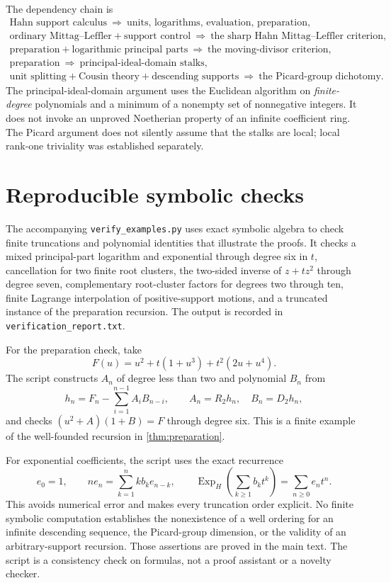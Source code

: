 \documentclass[11pt,letterpaper]{article}
\theoremstyle{definition}
\theoremstyle{remark}
\newcommand{\ExpH}{\operatorname{Exp}_{H}}
\numberwithin{equation}{section}
\begin{document}
The dependency chain is
\[
 \begin{gathered}
 \text{Hahn support calculus}\ \Longrightarrow\
 \text{units, logarithms, evaluation, preparation},\\
 \text{ordinary Mittag--Leffler}+\text{support control}\ \Longrightarrow\
 \text{the sharp Hahn Mittag--Leffler criterion},\\
 \text{preparation}+\text{logarithmic principal parts}\ \Longrightarrow\
 \text{the moving-divisor criterion},\\
 \text{preparation}\ \Longrightarrow\ \text{principal-ideal-domain stalks},\\
 \text{unit splitting}+\text{Cousin theory}+\text{descending supports}\
 \Longrightarrow\ \text{the Picard-group dichotomy}.
 \end{gathered}
\]
The principal-ideal-domain argument uses the Euclidean algorithm on \emph{finite-degree} polynomials and a minimum of a nonempty set of nonnegative integers. It does not invoke an unproved Noetherian property of an infinite coefficient ring. The Picard argument does not silently assume that the stalks are local; local rank-one triviality was established separately.

\section{Reproducible symbolic checks}\label{app:checks}
The accompanying \texttt{verify\_examples.py} uses exact symbolic algebra to check finite truncations and polynomial identities that illustrate the proofs. It checks a mixed principal-part logarithm and exponential through degree six in $t$, cancellation for two finite root clusters, the two-sided inverse of $z+t z^2$ through degree seven, complementary root-cluster factors for degrees two through ten, finite Lagrange interpolation of positive-support motions, and a truncated instance of the preparation recursion. The output is recorded in \texttt{verification\_report.txt}.

For the preparation check, take
\[
 F(u)=u^2+t(1+u^3)+t^2(2u+u^4).
\]
The script constructs $A_n$ of degree less than two and polynomial $B_n$ from
\[
 h_n=F_n-\sum_{i=1}^{n-1}A_iB_{n-i},\qquad
 A_n=R_2h_n,\quad B_n=D_2h_n,
\]
and checks $(u^2+A)(1+B)=F$ through degree six. This is a finite example of the well-founded recursion in \cref{thm:preparation}.

For exponential coefficients, the script uses the exact recurrence
\[
 e_0=1,\qquad
 n e_n=\sum_{k=1}^{n}k b_k e_{n-k},
 \qquad \ExpH\left(\sum_{k\ge1}b_kt^k\right)=\sum_{n\ge0}e_nt^n.
\]
This avoids numerical error and makes every truncation order explicit. No finite symbolic computation establishes the nonexistence of a well ordering for an infinite descending sequence, the Picard-group dimension, or the validity of an arbitrary-support recursion. Those assertions are proved in the main text. The script is a consistency check on formulas, not a proof assistant or a novelty checker.
\end{document}
